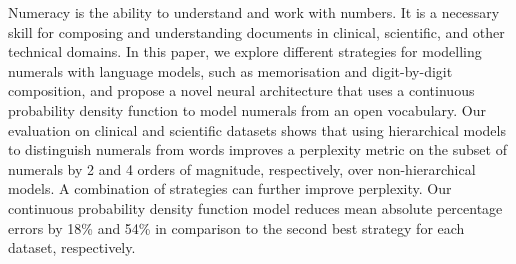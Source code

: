 Numeracy is the ability to understand and work with numbers. It is a necessary skill for composing and understanding documents in clinical, scientific, and other technical domains. In this paper, we explore different strategies for modelling numerals with language models, such as memorisation and digit-by-digit composition, and propose a novel neural architecture that uses a continuous probability density function to model numerals from an open vocabulary. Our evaluation on clinical and scientific datasets shows that using hierarchical models to distinguish numerals from words improves a perplexity metric on the subset of numerals by 2 and 4 orders of magnitude, respectively, over non-hierarchical models. A combination of strategies can further improve perplexity. Our continuous probability density function model reduces mean absolute percentage errors by 18\% and 54\% in comparison to the second best strategy for each dataset, respectively.
